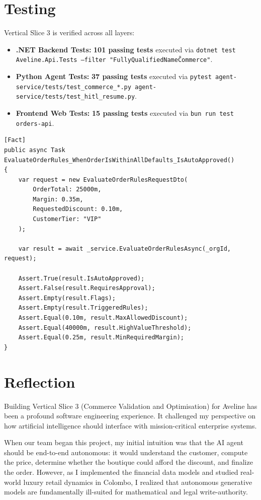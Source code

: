 \section{Testing}
\label{sec:c-testing}

Vertical Slice 3 is verified across all layers:
\begin{itemize}
    \item \textbf{.NET Backend Tests:} \textbf{101 passing tests} executed via \texttt{dotnet test Aveline.Api.Tests --filter "FullyQualifiedName\~Commerce"}.
    \item \textbf{Python Agent Tests:} \textbf{37 passing tests} executed via \texttt{pytest agent-service/tests/test\_commerce\_*.py agent-service/tests/test\_hitl\_resume.py}.
    \item \textbf{Frontend Web Tests:} \textbf{15 passing tests} executed via \texttt{bun run test orders-api}.
\end{itemize}

\begin{lstlisting}[language={[Sharp]C},caption={Rules matrix evaluation test in \texttt{BusinessRulesServiceTests.cs}}]
[Fact]
public async Task EvaluateOrderRules_WhenOrderIsWithinAllDefaults_IsAutoApproved()
{
    var request = new EvaluateOrderRulesRequestDto(
        OrderTotal: 25000m,
        Margin: 0.35m,
        RequestedDiscount: 0.10m,
        CustomerTier: "VIP"
    );

    var result = await _service.EvaluateOrderRulesAsync(_orgId, request);

    Assert.True(result.IsAutoApproved);
    Assert.False(result.RequiresApproval);
    Assert.Empty(result.Flags);
    Assert.Empty(result.TriggeredRules);
    Assert.Equal(0.10m, result.MaxAllowedDiscount);
    Assert.Equal(40000m, result.HighValueThreshold);
    Assert.Equal(0.25m, result.MinRequiredMargin);
}
\end{lstlisting}

\section{Reflection}
\label{sec:c-reflection}

Building Vertical Slice 3 (Commerce Validation and Optimisation) for Aveline has been a profound software engineering experience. It challenged my perspective on how artificial intelligence should interface with mission-critical enterprise systems.

When our team began this project, my initial intuition was that the AI agent should be end-to-end autonomous: it would understand the customer, compute the price, determine whether the boutique could afford the discount, and finalize the order. However, as I implemented the financial data models and studied real-world luxury retail dynamics in Colombo, I realized that autonomous generative models are fundamentally ill-suited for mathematical and legal write-authority. 

